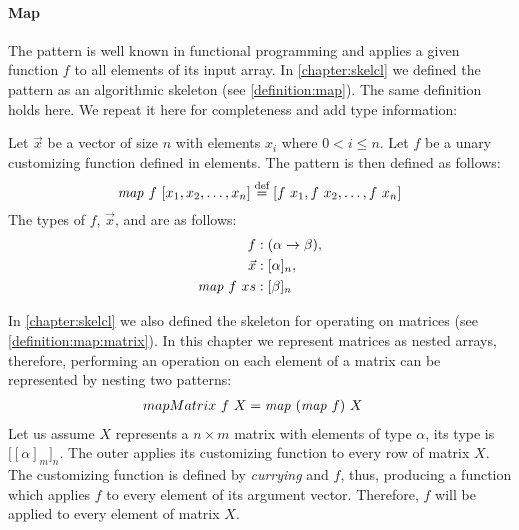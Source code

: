 \paragraph{Map}
The \map pattern is well known in functional programming and applies a given function $f$ to all elements of its input array.
In \autoref{chapter:skelcl} we defined the \map pattern as an algorithmic skeleton (see \autoref{definition:map}).
The same definition holds here.
We repeat it here for completeness and add type information:
\begin{definition}
  \label{definition:pattern:map}
  Let $\vec{x}$ be a vector of size $n$ with elements $x_i$ where $0 < i \leq n$.
  Let $f$ be a unary customizing function defined in elements.
  The \map pattern is then defined as follows:
  \begin{equation*}
    \text{\textit{map}}\ f\ [x_1, x_2, \dots, x_n] \stackrel{\textrm{\scriptsize def}}{=} [f\ x_1, f\ x_2, \dots, f\ x_n]
  \end{equation*}
  The types of $f$, $\vec{x}$, and \map are as follows:
  \begin{align*}
    f &: (\alpha \rightarrow \beta),\\
    \vec{x} &: [\alpha]_n,\\
    \text{\textit{map}}\ f\ xs &: [\beta]_n
  \end{align*}
\end{definition}

\noindent
In \autoref{chapter:skelcl} we also defined the \map skeleton for operating on matrices (see \autoref{definition:map:matrix}).
In this chapter we represent matrices as nested arrays, therefore, performing an operation on each element of a matrix can be represented by nesting two \map patterns:
\begin{align*}
  mapMatrix\ f\ X &= \text{\textit{map}}\ (\text{\textit{map}}\ f)\ X
\end{align*}
Let us assume $X$ represents a $n\times m$ matrix with elements of type $\alpha$, its type is $\big[[\alpha]_m\big]_n$.
The outer \map applies its customizing function to every row of matrix $X$.
The customizing function is defined by \emph{currying} \map and $f$, thus, producing a function which applies $f$ to every element of its argument vector.
Therefore, $f$ will be applied to every element of matrix $X$.

